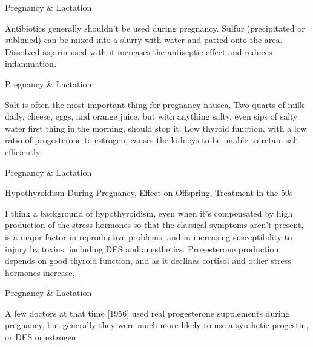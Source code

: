 \documentclass[11pt,oneside,openany,extrafontsizes]{memoir}
\begin{document}
\begin{qaexchange}{Pregnancy \& Lactation}

    \begin{answer}
        Antibiotics generally shouldn't be used during pregnancy. Sulfur (precipitated or sublimed) can be mixed into a slurry with water and patted onto the area. Dissolved aspirin used with it increases the antiseptic effect and reduces inflammation.
    \end{answer}
\end{qaexchange}

\begin{standalonequote}{Pregnancy \& Lactation}

    \begin{answer}
        Salt is often the most important thing for pregnancy nausea. Two quarts of milk daily, cheese, eggs, and orange juice, but with anything salty, even sips of salty water first thing in the morning, should stop it. Low thyroid function, with a low ratio of progesterone to estrogen, causes the kidneys to be unable to retain salt efficiently.
    \end{answer}
\end{standalonequote}

\begin{standalonequote}{Pregnancy \& Lactation}
    \begin{note}
        Hypothyroidism During Pregnancy, Effect on Offspring, Treatment in the 50s
    \end{note}

    \begin{answer}
        I think a background of hypothyroidism, even when it's compensated by high production of the stress hormones so that the classical symptoms aren't present, is a major factor in reproductive problems, and in increasing susceptibility to injury by toxins, including DES and anesthetics. Progesterone production depends on good thyroid function, and as it declines cortisol and other stress hormones increase.
    \end{answer}
\end{standalonequote}

\begin{standalonequote}{Pregnancy \& Lactation}

    \begin{answer}
        A few doctors at that time [1956] used real progesterone supplements during pregnancy, but generally they were much more likely to use a synthetic progestin, or DES or estrogen.
    \end{answer}
\end{standalonequote}
\end{document}
